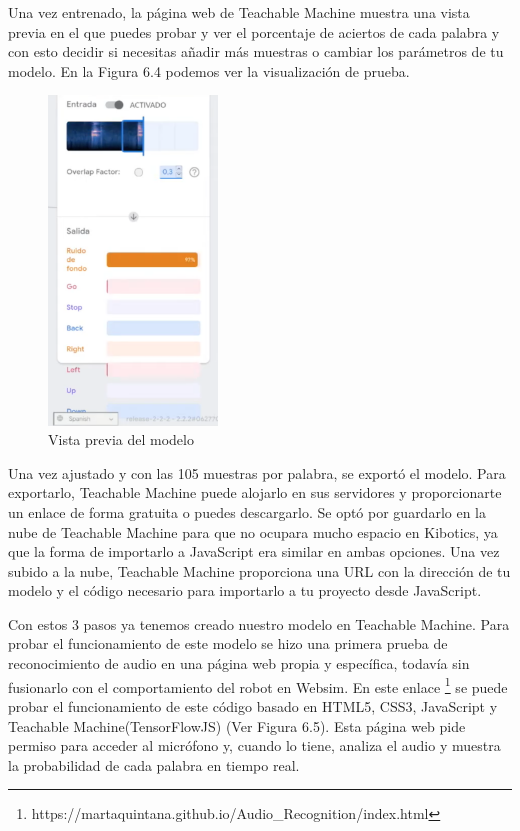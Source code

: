 \begin{itemize}
Una vez entrenado, la página web de Teachable Machine muestra una vista previa en el que puedes probar y ver el porcentaje de aciertos de cada palabra y con esto decidir si necesitas añadir más muestras o cambiar los parámetros de tu modelo.  En la Figura 6.4 podemos ver la visualización de prueba.

\begin{figure}[H]
 \centering
    \includegraphics[width=0.4\textwidth, height=0.6\textwidth]{chapters/images/teachablemachine2.png}
    \caption{Vista previa del modelo}
\end{figure}
 

Una vez ajustado y con las 105 muestras por palabra, se exportó el modelo. 
Para exportarlo, Teachable Machine puede alojarlo en sus servidores y proporcionarte  un enlace de forma gratuita o puedes descargarlo. Se optó por guardarlo en la nube de Teachable Machine para que no ocupara mucho espacio en Kibotics, ya que la forma de importarlo  a JavaScript era similar en ambas opciones.
Una vez subido a la nube, Teachable Machine proporciona una URL con la dirección de tu modelo y el código necesario para importarlo a tu proyecto desde JavaScript.
\end{itemize}

Con estos 3 pasos ya tenemos creado nuestro modelo en Teachable Machine. Para probar el funcionamiento de este modelo se hizo una  primera prueba de reconocimiento de audio en una página web propia y específica, todavía sin fusionarlo con el comportamiento del robot en Websim. En este enlace \footnote{https://martaquintana.github.io/Audio\_Recognition/index.html} se puede probar el funcionamiento de este código basado en HTML5, CSS3, JavaScript y Teachable Machine(TensorFlowJS) (Ver Figura 6.5). Esta página web pide permiso para acceder al micrófono y, cuando lo tiene, analiza el audio  y muestra la probabilidad de cada palabra en tiempo real.  

